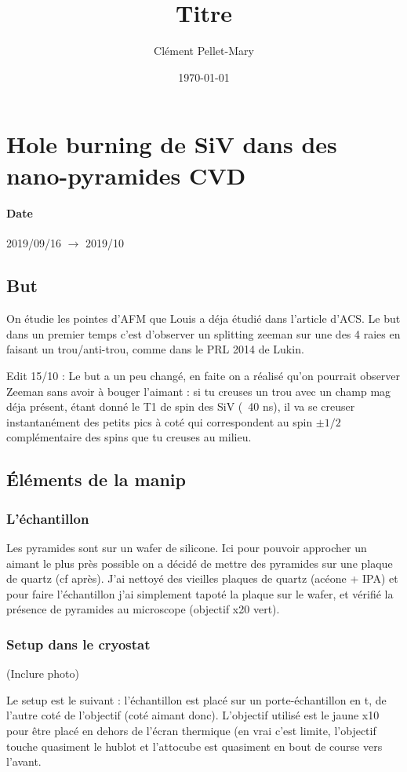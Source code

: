 \documentclass[a4paper]{report}
\title{Titre}
\author{Clément Pellet-Mary}
\date\today
\begin{document}
\chapter{Hole burning de SiV dans des nano-pyramides CVD}
\subsubsection{Date}
2019/09/16 $\to$ 2019/10
  \section{But}
  On étudie les pointes d'AFM que Louis a déja étudié dans l'article d'ACS. Le but dans un premier temps c'est d'observer un splitting zeeman sur une des 4 raies en faisant un trou/anti-trou, comme dans le PRL 2014 de Lukin.
  
  Edit 15/10 : Le but a un peu changé, en faite on a réalisé qu'on pourrait observer Zeeman sans avoir à bouger l'aimant : si tu creuses un trou avec un champ mag déja présent, étant donné le T1 de spin des SiV (~40 ns), il va se creuser instantanément des petits pics à coté qui correspondent au spin $\pm 1/2$ complémentaire des spins que tu creuses au milieu.
  \section{Éléments de la manip}
  \subsection{L'échantillon}
  Les pyramides sont sur un wafer de silicone. Ici pour pouvoir approcher un aimant le plus près possible on a décidé de mettre des pyramides sur une plaque de quartz (cf après). J'ai nettoyé des vieilles plaques de quartz (acéone + IPA) et pour faire l'échantillon j'ai simplement tapoté la plaque sur le wafer, et vérifié la présence de pyramides au microscope (objectif x20 vert).
  \subsection{Setup dans le cryostat}
  (Inclure photo)
  
  Le setup est le suivant : l'échantillon est placé sur un porte-échantillon en t, de l'autre coté de l'objectif (coté aimant donc). L'objectif utilisé est le jaune x10 pour être placé en dehors de l'écran thermique (en vrai c'est limite, l'objectif touche quasiment le hublot et l'attocube est quasiment en bout de course vers l'avant.
  
\end{document}
